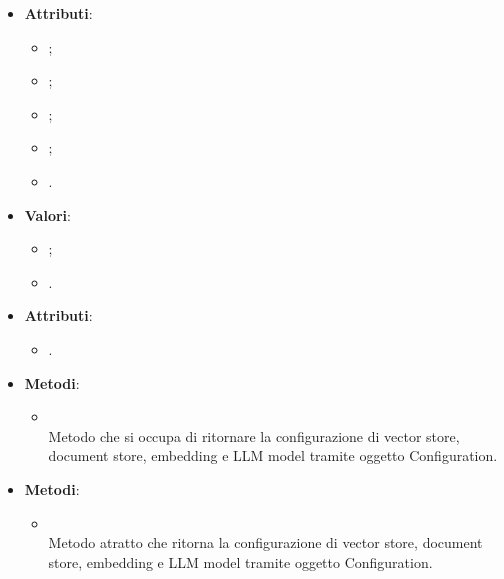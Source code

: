 \documentclass[10pt, a4paper]{article}
\begin{document}
\label{EmbeddingModelConfigurationDettaglio}
\begin{itemize}
    \item \textbf{Attributi}:
    \begin{itemize}
        \item {};
        \item {};
        \item {};
        \item {};
        \item {}.  
    \end{itemize}
\end{itemize}

\label{EmbeddingModelTypeDettaglio}
\begin{itemize}
    \item \textbf{Valori}:
    \begin{itemize}
        \item {};
        \item {}. 
    \end{itemize}
\end{itemize}


\label{GetConfigurationControllerDettaglio}
\begin{itemize}
    \item \textbf{Attributi}:
    \begin{itemize}
        \item {}.  
    \end{itemize}
    \item \textbf{Metodi}:
    \begin{itemize}
        \item {}\\
        Metodo che si occupa di ritornare la configurazione di vector store, document store, embedding e LLM model tramite oggetto Configuration.
    \end{itemize}
\end{itemize}





\label{GetConfigurationPortDettaglio}
\begin{itemize}
    \item \textbf{Metodi}:
    \begin{itemize}
        \item {}\\
        Metodo atratto che ritorna la configurazione di vector store, document store, embedding e LLM model tramite oggetto Configuration.
    \end{itemize}
\end{itemize}
\end{document}
